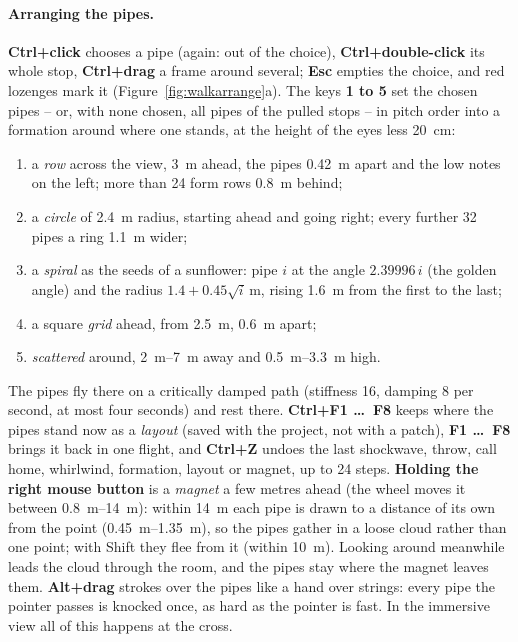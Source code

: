 \documentclass[11pt,a4paper,parskip=half,DIV=11,toc=bibliography]{scrartcl}
\begin{document}
\paragraph{Arranging the pipes.} \textbf{Ctrl+click} chooses a pipe (again: out of the choice), \textbf{Ctrl+double-click} its whole stop,
\textbf{Ctrl+drag} a frame around several; \textbf{Esc} empties the choice, and red lozenges mark it (Figure~\ref{fig:walkarrange}a). The keys
\textbf{1 to 5} set the chosen pipes -- or, with none chosen, all pipes of the pulled stops -- in pitch order into a formation around where one stands,
at the height of the eyes less \SI{20}{cm}:
\begin{enumerate}
  \item a \emph{row} across the view, \SI{3}{m} ahead, the pipes \SI{0.42}{m} apart and the low notes on the left; more than 24 form rows \SI{0.8}{m} behind;
  \item a \emph{circle} of \SI{2.4}{m} radius, starting ahead and going right; every further 32 pipes a ring \SI{1.1}{m} wider;
  \item a \emph{spiral} as the seeds of a sunflower: pipe $i$ at the angle $2.39996\,i$ (the golden angle) and the radius $1.4+0.45\sqrt i$\,m, rising
        \SI{1.6}{m} from the first to the last;
  \item a square \emph{grid} ahead, from \SI{2.5}{m}, \SI{0.6}{m} apart;
  \item \emph{scattered} around, \SIrange{2}{7}{m} away and \SIrange{0.5}{3.3}{m} high.
\end{enumerate}
The pipes fly there on a critically damped path (stiffness 16, damping 8 per second, at most four seconds) and rest there. \textbf{Ctrl+F1 \dots\ F8}
keeps where the pipes stand now as a \emph{layout} (saved with the project, not with a patch), \textbf{F1 \dots\ F8} brings it back in one flight, and
\textbf{Ctrl+Z} undoes the last shockwave, throw, call home, whirlwind, formation, layout or magnet, up to 24 steps.
\textbf{Holding the right mouse button} is a \emph{magnet} a few metres ahead (the wheel moves it between \SIrange{0.8}{14}{m}): within \SI{14}{m}
each pipe is drawn to a distance of its own from the point (\SIrange{0.45}{1.35}{m}), so the pipes gather in a loose cloud rather than one point; with
Shift they flee from it (within \SI{10}{m}). Looking around meanwhile leads the cloud through the room, and the pipes stay where the magnet leaves them.
\textbf{Alt+drag} strokes over the pipes like a hand over strings: every pipe the pointer passes is knocked once, as hard as the pointer is fast.
In the immersive view all of this happens at the cross.
\end{document}
